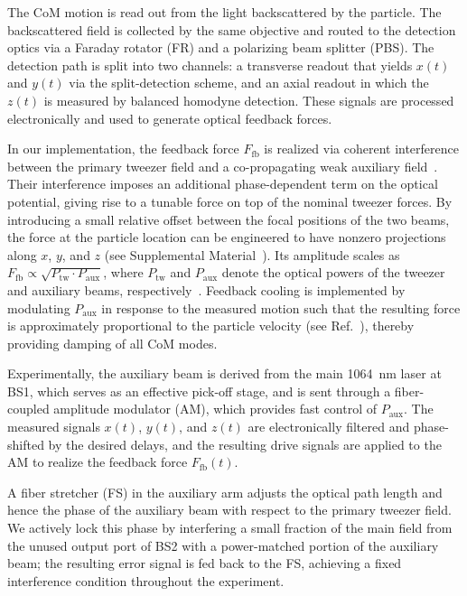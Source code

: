 \documentclass[%
 reprint,
 amsmath,amssymb,
 aps,
prl,
]{revtex4-2}
\begin{document}
The CoM motion is read out from the light backscattered by the particle. The backscattered field is collected by the same objective and routed to the detection optics via a Faraday rotator (FR) and a polarizing beam splitter (PBS). The detection path is split into two channels: a transverse readout that yields $x(t)$ and $y(t)$ via the split-detection scheme, and an axial readout in which the $z(t)$ is measured by balanced homodyne detection. These signals are processed electronically and used to generate optical feedback forces.

In our implementation, the feedback force $F_{\mathrm{fb}}$ is realized via coherent interference between the primary tweezer field and a co-propagating weak auxiliary field~\cite{alavi_interference-enhanced_2025}. Their interference imposes an additional phase-dependent term on the optical potential, giving rise to a tunable force on top of the nominal tweezer forces. By introducing a small relative offset between the focal positions of the two beams, the force at the particle location can be engineered to have nonzero projections along $x$, $y$, and $z$ (see Supplemental Material~\cite{SM}). Its amplitude scales as $F_{\mathrm{fb}} \propto \sqrt{P_{\mathrm{tw}}\cdot P_{\mathrm{aux}}}$, where $P_{\mathrm{tw}}$ and $P_{\mathrm{aux}}$ denote the optical powers of the tweezer and auxiliary beams, respectively~\cite{alavi_interference-enhanced_2025}. Feedback cooling is implemented by modulating $P_{\mathrm{aux}}$ in response to the measured motion such that the resulting force is approximately proportional to the particle velocity (see Ref.~\cite{SM}), thereby providing damping of all CoM modes.

Experimentally, the auxiliary beam is derived from the main 1064~nm laser at BS1, which serves as an effective pick-off stage, and is sent through a fiber-coupled amplitude modulator (AM), which provides fast control of $P_{\mathrm{aux}}$. The measured signals $x(t)$, $y(t)$, and $z(t)$ are electronically filtered and phase-shifted by the desired delays, and the resulting drive signals are applied to the AM to realize the feedback force $F_{\mathrm{fb}}(t)$.

A fiber stretcher (FS) in the auxiliary arm adjusts the optical path length and hence the phase of the auxiliary beam with respect to the primary tweezer field. We actively lock this phase by interfering a small fraction of the main field from the unused output port of BS2 with a power-matched portion of the auxiliary beam; the resulting error signal is fed back to the FS, achieving a fixed interference condition throughout the experiment.
\end{document}
